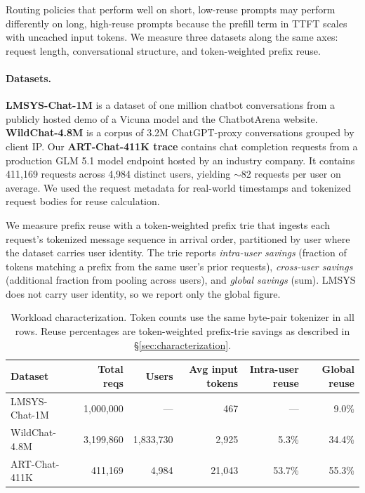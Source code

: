 \documentclass{article}
\begin{document}
Routing policies that perform well on short, low-reuse prompts may perform
differently on long, high-reuse prompts because the prefill term in TTFT scales
with uncached input tokens. We measure three datasets along the same axes:
request length, conversational structure, and token-weighted prefix reuse.

\paragraph{Datasets.}
\textbf{LMSYS-Chat-1M} \citep{lmsys2024} is a dataset of one million chatbot conversations from a publicly hosted demo of a Vicuna model and the ChatbotArena website. \textbf{WildChat-4.8M} \citep{wildchat2024} is a corpus
of 3.2M ChatGPT-proxy conversations grouped by client IP. Our \textbf{ART-Chat-411K
trace} contains chat completion requests from a production
GLM 5.1 model endpoint hosted by an industry company\citep{glm2024}. It contains 411{,}169 requests across 4{,}984 distinct
users, yielding $\sim$82 requests per user on average. We used the request metadata for real-world timestamps and tokenized request bodies for reuse calculation.

We measure prefix reuse with a token-weighted prefix trie that ingests each
request's tokenized message sequence in arrival order, partitioned by user where
the dataset carries user identity. The trie reports \textit{intra-user savings}
(fraction of tokens matching a prefix from the same user's prior requests),
\textit{cross-user savings} (additional fraction from pooling across users), and
\textit{global savings} (sum). LMSYS does not carry user identity, so we report
only the global figure.

\begin{table}[t]
\centering
\small
\caption{Workload characterization. Token counts use the same byte-pair
  tokenizer in all rows. Reuse percentages are token-weighted prefix-trie
  savings as described in \S\ref{sec:characterization}.}
\label{tab:datasets}
\begin{tabular}{lrrrrr}
\toprule
Dataset & Total reqs & Users & Avg input tokens & Intra-user reuse & Global reuse \\
\midrule
LMSYS-Chat-1M & 1{,}000{,}000 & --- & 467 & --- & 9.0\% \\
WildChat-4.8M & 3{,}199{,}860 & 1{,}833{,}730 & 2{,}925 & 5.3\% & 34.4\% \\
ART-Chat-411K & 411{,}169 & 4{,}984 & 21{,}043 & 53.7\% & 55.3\% \\
\bottomrule
\end{tabular}
\end{table}
\end{document}
